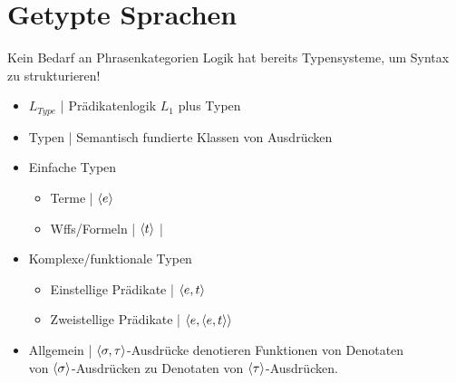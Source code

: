 \section{Getypte Sprachen}

\begin{frame}
  {Kein Bedarf an Phrasenkategorien}
  \onslide<+->
  \onslide<+->
  Logik hat bereits \alert{Typensysteme}, um Syntax zu strukturieren!\\
  \Halbzeile
  \begin{itemize}[<+->]
    \item \alert{$L_{Type}$} | Prädikatenlogik \alert{$L_1$ plus Typen}
    \item \alert{Typen} | Semantisch fundierte Klassen von Ausdrücken
      \Halbzeile
    \item Einfache Typen
      \begin{itemize}[<+->]
        \item Terme | ${\langle{}e\rangle}$
        \item Wffs\slash Formeln | ${\langle{}t\rangle}$ | 
      \end{itemize}
      \Halbzeile
    \item Komplexe\slash \alert{funktionale} Typen
      \begin{itemize}[<+->]
        \item Einstellige Prädikate | ${\langle{}e,t\rangle}$
        \item Zweistellige Prädikate | ${\langle{}e,{\langle{}e,t\rangle}\rangle}$
      \end{itemize}
      \Halbzeile
    \item Allgemein | ${\langle{}\sigma,\tau\rangle}$-Ausdrücke denotieren Funktionen von Denotaten\\
      von ${\langle{}\sigma\rangle}$-Ausdrücken zu Denotaten von ${\langle{}\tau\rangle}$-Ausdrücken.
  \end{itemize}
\end{frame}

